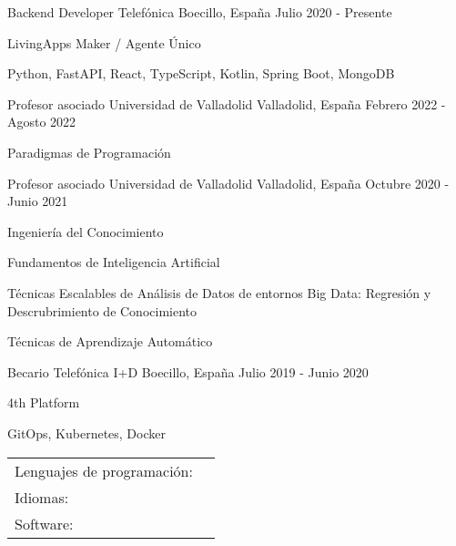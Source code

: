 \documentclass[]{awesome-cv}
\begin{document}
\vspace{-2mm}
\begin{cventries}
	\cventry
	{Backend Developer}
	{Telefónica}
	{Boecillo, España}
	{Julio 2020 - Presente}
	{\begin{cvitems}
		\item {LivingApps Maker / Agente Único}
		\item {Python, FastAPI, React, TypeScript, Kotlin, Spring Boot, MongoDB}
	\end{cvitems}}
        \cventry
            {Profesor asociado}
            {Universidad de Valladolid}
            {Valladolid, España}
            {Febrero 2022 - Agosto 2022}
            {\begin{cvitems}
              \item {Paradigmas de Programación}
              \end{cvitems}
            }
	\cventry
	{Profesor asociado}
	{Universidad de Valladolid}
	{Valladolid, España}
	{Octubre 2020 - Junio 2021}
	{\begin{cvitems}
	    \item {Ingeniería del Conocimiento}
		\item {Fundamentos de Inteligencia Artificial}
		\item {Técnicas Escalables de Análisis de Datos de entornos Big Data: Regresión y Descrubrimiento de Conocimiento}
		\item {Técnicas de Aprendizaje Automático}
	\end{cvitems}}
	\cventry
	{Becario}
	{Telefónica I+D}
	{Boecillo, España}
	{Julio 2019 - Junio 2020}
	{\begin{cvitems}
		\item {4th Platform}
		\item {GitOps, Kubernetes, Docker}
	\end{cvitems}
	}
\end{cventries}
\begin{cventries}
	\cventry
	{}
	{\def\arraystretch{1.15}{\begin{tabular}{ l l }
		Lenguajes de programación:  & {\skill{ Rust, C, Python, Java, Kotlin, JavaScript, SQL, Prolog}} \\
		Idiomas:  & {\skill{ Español (nativo), Inglés ( FIRST B2)}} \\
		Software: & {\skill{Linux, Kubernetes, Docker, Azure, AWS, \LaTeX , PostgreSQL, Emacs, Microsoft Office, Git}} \\
		\end{tabular}}}
	{}
	{}
	{}
\end{cventries}
\end{document}
